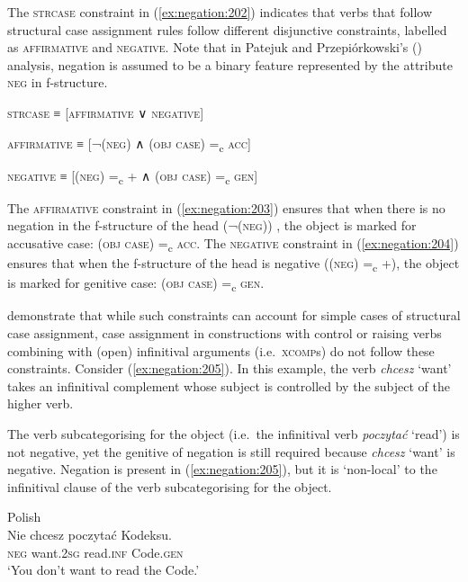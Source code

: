 \documentclass[output=paper,hidelinks]{langscibook}
\begin{document}
The \textsc{strcase} constraint in (\ref{ex:negation:202}) indicates that verbs that follow structural case assignment rules follow different disjunctive constraints, labelled as \textsc{affirmative} and \textsc{negative}. Note that in Patejuk and Przepiórkowski’s (\citeyear{PatejukPrzepiorkowski2014a}) analysis, negation is assumed to be a  binary feature represented by the attribute \textsc{neg} in f-structure.

\ea
\label{ex:negation:202} 
 \textsc{strcase} ≡ [\textsc{affirmative} ∨ \textsc{negative}]\\
 \z
 
 
\ea
\label{ex:negation:203} 
\textsc{affirmative} ≡ [¬(\UP \textsc{neg}) ∧ (\UP \textsc{obj case}) =\textsubscript{c}  \textsc{acc}] 
 \z
 
\ea
\label{ex:negation:204} 
\textsc{negative} ≡ [(\UP  \textsc{neg}) =\textsubscript{c}  + ∧ (\UP \textsc {obj case}) =\textsubscript{c} \textsc{gen}] 
 \z

The \textsc{affirmative} constraint in (\ref{ex:negation:203}) ensures that when there is no negation in the f-structure of the head (¬(\UP  \textsc{neg})) , the object is marked for accusative case: (\UP  \textsc{obj case}) =\textsubscript{c}  \textsc{acc}. The \textsc{negative} constraint in (\ref{ex:negation:204}) ensures that when the f-structure of the head is negative ((\UP  \textsc{neg}) =\textsubscript{c} +), the object is marked for genitive case: (\UP  \textsc{obj case}) =\textsubscript{c}  \textsc{gen}. 

\citet{PatejukPrzepiorkowski2014a} demonstrate that while such constraints can account for simple cases of structural case assignment, case assignment in constructions with control or raising verbs combining with (open) infinitival arguments (i.e.\ \textsc{xcomp}s) do not follow these constraints. Consider (\ref{ex:negation:205}). In this example, the verb \emph{chcesz} ‘want’ takes an infinitival complement whose subject is controlled by the subject of the higher verb.

The verb subcategorising for the object (i.e.\ the infinitival verb \emph{poczytać} ‘read’) is not negative, yet the genitive of negation is still required because \emph{chcesz} ‘want’ is negative. Negation is present in (\ref{ex:negation:205}), but it is ‘non-local’ to the infinitival clause of the verb subcategorising for the object.

\ea\label{ex:negation:205} Polish \citep [432] {PatejukPrzepiorkowski2014a}\\
\gll Nie chcesz poczytać Kodeksu.\\
\textsc{neg} want.\textsc{2sg} read.\textsc{inf} Code.\textsc{gen}\\
\glt ‘You don’t want to read the Code.’
\z
\end{document}
